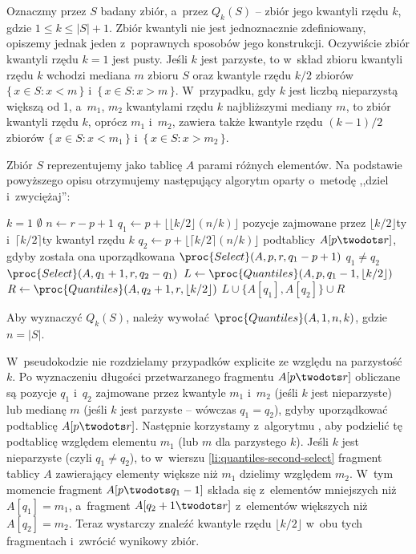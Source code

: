 \exercise %
Oznaczmy przez $S$ badany zbiór, a~przez $Q_k(S)$ -- zbiór jego kwantyli rzędu $k$, gdzie $1\le k\le|S|+1$.
Zbiór kwantyli nie jest jednoznacznie zdefiniowany, opiszemy jednak jeden z~poprawnych sposobów jego konstrukcji.
Oczywiście zbiór kwantyli rzędu $k=1$ jest pusty.
Jeśli $k$ jest parzyste, to w~skład zbioru kwantyli rzędu $k$ wchodzi mediana $m$ zbioru $S$ oraz kwantyle rzędu $k/2$ zbiorów $\{\,x\in S:x<m\,\}$ i~$\{\,x\in S:x>m\,\}$.
W~przypadku, gdy $k$ jest liczbą nieparzystą większą od 1, a~$m_1$, $m_2$ kwantylami rzędu $k$ najbliższymi mediany $m$, to zbiór kwantyli rzędu $k$, oprócz $m_1$ i~$m_2$, zawiera także kwantyle rzędu $(k-1)/2$ zbiorów $\{\,x\in S:x<m_1\,\}$ i~$\{\,x\in S:x>m_2\,\}$.

Zbiór $S$ reprezentujemy jako tablicę $A$ parami różnych elementów.
Na podstawie powyższego opisu otrzymujemy następujący algorytm oparty o~metodę ,,dziel i~zwyciężaj'':
\begin{codebox}
\li	\If $k=1$
\li		\Then \Return $\emptyset$
		\End
\li	$n\gets r-p+1$
\li	$q_1\gets p+\lfloor\lfloor k/2\rfloor(n/k)\rfloor$ \>\>\>\>\>\>\Comment pozycje zajmowane przez $\lfloor k/2\rfloor$\nbhyphen ty i~$\lceil k/2\rceil$\nbhyphen ty kwantyl rzędu $k$
\li	$q_2\gets p+\lfloor\lceil k/2\rceil(n/k)\rfloor$ \>\>\>\>\>\>\>podtablicy $A[p\twodots r]$, gdyby została ona uporządkowana
\li	$\proc{Select}(A,p,r,q_1-p+1)$
\li	\If $q_1\ne q_2$
\li		\Then $\proc{Select}(A,q_1+1,r,q_2-q_1)$ \label{li:quantiles-second-select}
		\End
\li	$L\gets\proc{Quantiles}(A,p,q_1-1,\lfloor k/2\rfloor)$
\li	$R\gets\proc{Quantiles}(A,q_2+1,r,\lfloor k/2\rfloor)$
\li	\Return $L\cup\{A[q_1],A[q_2]\}\cup R$
\end{codebox}
Aby wyznaczyć $Q_k(S)$, należy wywołać $\proc{Quantiles}(A,1,n,k)$, gdzie $n=|S|$.

W~pseudokodzie nie rozdzielamy przypadków explicite ze względu na parzystość $k$.
Po wyznaczeniu długości przetwarzanego fragmentu $A[p\twodots r]$ obliczane są pozycje $q_1$ i~$q_2$ zajmowane przez kwantyle $m_1$ i~$m_2$ (jeśli $k$ jest nieparzyste) lub medianę $m$ (jeśli $k$ jest parzyste -- wówczas $q_1=q_2$), gdyby uporządkować podtablicę $A[p\twodots r]$.
Następnie korzystamy z~algorytmu , aby podzielić tę podtablicę względem elementu $m_1$ (lub $m$ dla parzystego $k$).
Jeśli $k$ jest nieparzyste (czyli $q_1\ne q_2$), to w~wierszu \ref{li:quantiles-second-select} fragment tablicy $A$ zawierający elementy większe niż $m_1$ dzielimy względem $m_2$.
W~tym momencie fragment $A[p\twodots q_1-1]$ składa się z~elementów mniejszych niż $A[q_1]=m_1$, a~fragment $A[q_2+1\twodots r]$ z~elementów większych niż $A[q_2]=m_2$.
Teraz wystarczy znaleźć kwantyle rzędu $\lfloor k/2\rfloor$ w~obu tych fragmentach i~zwrócić wynikowy zbiór.

